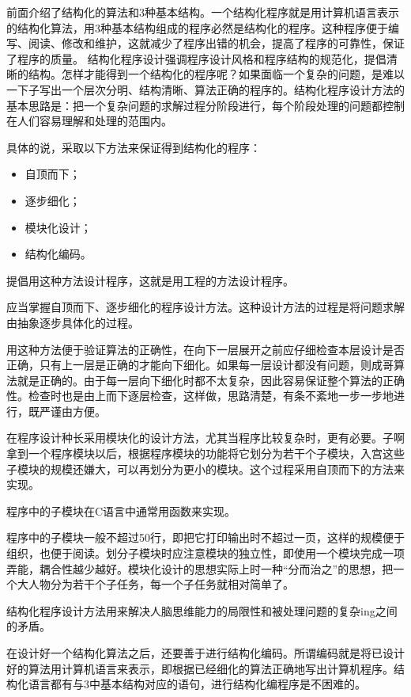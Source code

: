 \begin{lslisting}
\begin{enumerate}
前面介绍了结构化的算法和3种基本结构。一个结构化程序就是用计算机语言表示的结构化算法，用3种基本结构组成的程序必然是结构化的程序。这种程序便于编写、阅读、修改和维护，这就减少了程序出错的机会，提高了程序的可靠性，保证了程序的质量。
结构化程序设计强调程序设计风格和程序结构的规范化，提倡清晰的结构。怎样才能得到一个结构化的程序呢？如果面临一个复杂的问题，是难以一下子写出一个层次分明、结构清晰、算法正确的程序的。结构化程序设计方法的基本思路是：把一个复杂问题的求解过程分阶段进行，每个阶段处理的问题都控制在人们容易理解和处理的范围内。

具体的说，采取以下方法来保证得到结构化的程序：
\begin{itemize}
	\item 自顶而下；
	\item 逐步细化；
	\item 模块化设计；
	\item 结构化编码。
\end{itemize}

提倡用这种方法设计程序，这就是用工程的方法设计程序。

应当掌握自顶而下、逐步细化的程序设计方法。这种设计方法的过程是将问题求解由抽象逐步具体化的过程。

用这种方法便于验证算法的正确性，在向下一层展开之前应仔细检查本层设计是否正确，只有上一层是正确的才能向下细化。如果每一层设计都没有问题，则成哥算法就是正确的。由于每一层向下细化时都不太复杂，因此容易保证整个算法的正确性。检查时也是由上而下逐层检查，这样做，思路清楚，有条不紊地一步一步地进行，既严谨由方便。

在程序设计种长采用模块化的设计方法，尤其当程序比较复杂时，更有必要。子啊拿到一个程序模块以后，根据程序模块的功能将它划分为若干个子模块，入宫这些子模块的规模还嫌大，可以再划分为更小的模块。这个过程采用自顶而下的方法来实现。

程序中的子模块在C语言中通常用函数来实现。

程序中的子模块一般不超过50行，即把它打印输出时不超过一页，这样的规模便于组织，也便于阅读。划分子模块时应注意模块的独立性，即使用一个模块完成一项弄能，耦合性越少越好。模块化设计的思想实际上时一种“分而治之”的思想，把一个大人物分为若干个子任务，每一个子任务就相对简单了。

结构化程序设计方法用来解决人脑思维能力的局限性和被处理问题的复杂ing之间的矛盾。

在设计好一个结构化算法之后，还要善于进行结构化编码。所谓编码就是将已设计好的算法用计算机语言来表示，即根据已经细化的算法正确地写出计算机程序。结构化语言都有与3中基本结构对应的语句，进行结构化编程序是不困难的。


\end{enumerate}
\end{lslisting}
